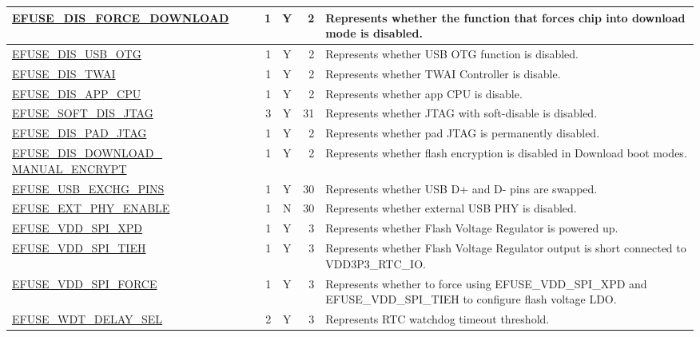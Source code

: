 \begin{longtable}[l]{ |m{8.2cm}|r|c|r|m{9cm}| }
    \hline    
    \hyperref[fielddesc:EFUSEDISFORCEDOWNLOAD]{EFUSE\_DIS\_FORCE\_DOWNLOAD} & 1 & Y & 2 & Represents whether the function that forces chip into download mode is disabled. \\   
    \hline
    \hyperref[fielddesc:EFUSEDISUSBOTG]{EFUSE\_DIS\_USB\_OTG} &1 & Y & 2 & Represents whether USB OTG function is disabled. \\     
    \hline
    \hyperref[fielddesc:EFUSEDISTWAI]{EFUSE\_DIS\_TWAI} & 1 & Y & 2 & Represents whether TWAI Controller is disable. \\  
    \hline
    \hyperref[fielddesc:EFUSEDISAPPCPU]{EFUSE\_DIS\_APP\_CPU} & 1 & Y & 2 & Represents whether app CPU is disable. \\   
    \hline
    \hyperref[fielddesc:EFUSESOFTDISJTAG]{EFUSE\_SOFT\_DIS\_JTAG} & 3 & Y & 31 & Represents whether JTAG with soft-disable is disabled. \\
    \hline
    \hyperref[fielddesc:EFUSEDISPADJTAG]{EFUSE\_DIS\_PAD\_JTAG} & 1 & Y & 2 & Represents whether pad JTAG is permanently disabled. \\   
    \hline
    \hyperref[fielddesc:EFUSEDISDOWNLOADMANUALENCRYPT]{EFUSE\_DIS\_DOWNLOAD\_
    MANUAL\_ENCRYPT} &  1 & Y & 2 & Represents whether flash encryption is disabled in Download boot modes.\\ 
    \hline
    \hyperref[fielddesc:EFUSEUSBEXCHGPINS]{EFUSE\_USB\_EXCHG\_PINS} & 1 & Y & 30 & Represents whether USB D+ and D- pins are swapped. \\
    \hline
    \hyperref[fielddesc:EFUSEEXTPHYENABLE]{EFUSE\_EXT\_PHY\_ENABLE} & 1 & N & 30 & Represents whether external USB PHY is disabled. \\
    \hline
    \hyperref[fielddesc:EFUSEVDDSPIXPD]{EFUSE\_VDD\_SPI\_XPD} & 1 & Y & 3 & Represents whether Flash Voltage Regulator is powered up. \\        
    \hline
    \hyperref[fielddesc:EFUSEVDDSPITIEH]{EFUSE\_VDD\_SPI\_TIEH} & 1 & Y & 3 & Represents whether Flash Voltage Regulator output is short connected to VDD3P3\_RTC\_IO. \\   
    \hline
    \hyperref[fielddesc:EFUSEVDDSPIFORCE]{EFUSE\_VDD\_SPI\_FORCE} & 1 & Y & 3 & Represents whether to force using EFUSE\_VDD\_SPI\_XPD and EFUSE\_VDD\_SPI\_TIEH to configure flash voltage LDO. \\ 
    \hline
    \hyperref[fielddesc:EFUSEWDTDELAYSEL]{EFUSE\_WDT\_DELAY\_SEL} & 2 & Y & 3 & Represents RTC watchdog timeout threshold. \\
    \hline

\end{longtable}
